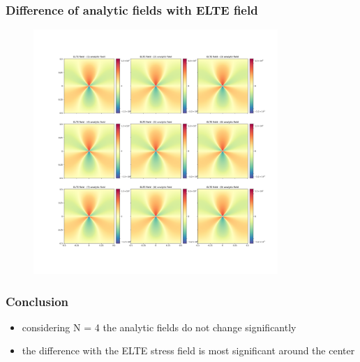 \documentclass{beamer}
\begin{document}
\begin{frame}
    \frametitle{Difference of analytic fields with ELTE field}
    
    \begin{figure}[H]
        \centering
        \includegraphics[width=0.825\textwidth]{../difference_of_analytic_field_and_elte_field.png}
    \end{figure}

\end{frame}

\begin{frame}
    \frametitle{Conclusion}
    
    \begin{itemize}
        \item considering N = 4 the analytic fields do not change significantly
        \item the difference with the ELTE stress field is most significant around the center
    \end{itemize}

\end{frame}
\end{document}
